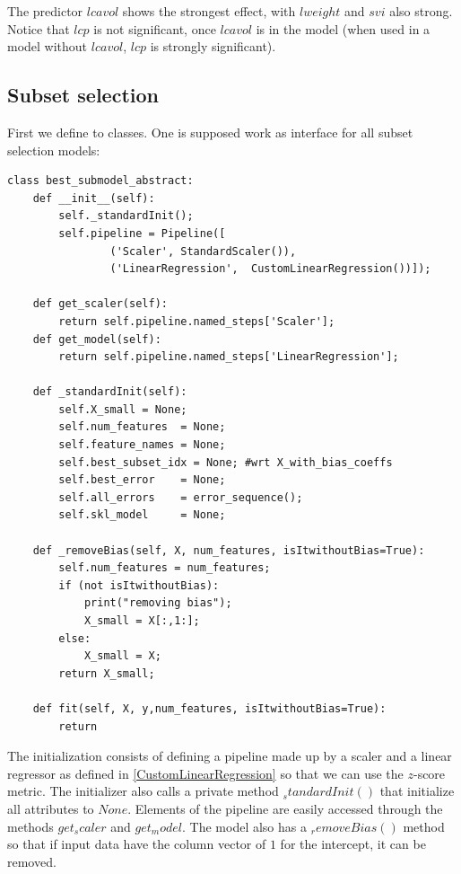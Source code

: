 \documentclass[12pt, letterpaper]{article}
\theoremstyle{definition}
\begin{document}
The predictor $lcavol$ shows the strongest effect, with $lweight$ and $svi$ also strong. Notice that $lcp$ is not significant, once $lcavol$ is in the model (when used in a model without $lcavol$, $lcp$ is strongly significant).

\subsection{Subset selection}
First we define to classes. One is supposed work as interface for all subset selection models:
\begin{lstlisting}
class best_submodel_abstract:
    def __init__(self):
        self._standardInit();
        self.pipeline = Pipeline([
                ('Scaler', StandardScaler()), 
                ('LinearRegression',  CustomLinearRegression())]);  
    
    def get_scaler(self):
        return self.pipeline.named_steps['Scaler'];
    def get_model(self):
        return self.pipeline.named_steps['LinearRegression'];
        
    def _standardInit(self):
        self.X_small = None;
        self.num_features  = None;
        self.feature_names = None;
        self.best_subset_idx = None; #wrt X_with_bias_coeffs
        self.best_error    = None;
        self.all_errors    = error_sequence();
        self.skl_model     = None;   
        
    def _removeBias(self, X, num_features, isItwithoutBias=True):
        self.num_features = num_features;
        if (not isItwithoutBias):
            print("removing bias");
            X_small = X[:,1:];
        else:
            X_small = X;
        return X_small;
    
    def fit(self, X, y,num_features, isItwithoutBias=True):
        return
\end{lstlisting}
The initialization consists of defining a pipeline made up by a scaler and a linear regressor as defined in \ref{CustomLinearRegression} so that we can use the $z$-score metric. The initializer also calls a private method $_standardInit()$ that initialize all attributes to $None$. Elements of the pipeline are easily accessed through the methods $get_scaler$ and $get_model$.  The model also has a $_removeBias()$ method so that if input data have the column vector of $1$ for the intercept, it can be removed.
\end{document}
